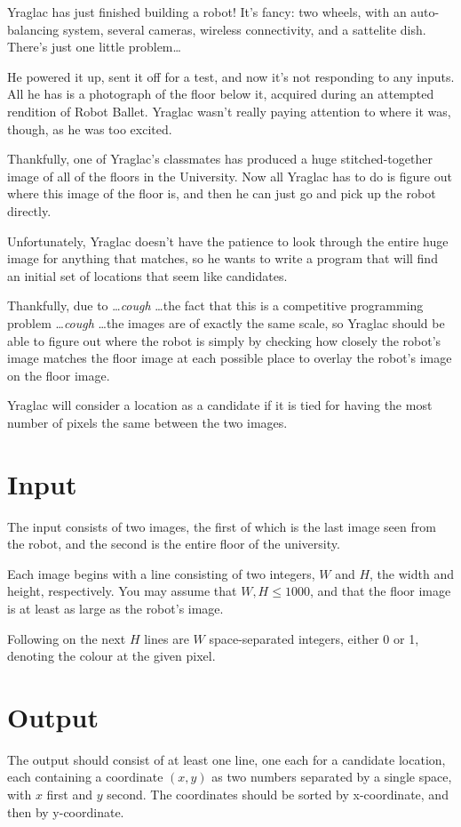 
Yraglac has just finished building a robot! It's fancy: two wheels, with an
auto-balancing system, several cameras, wireless connectivity, and a sattelite
dish. There's just one little problem\ldots

He powered it up, sent it off for a test, and now it's not responding to any
inputs. All he has is a photograph of the floor below it, acquired during an
attempted rendition of Robot Ballet. Yraglac wasn't really paying attention to
where it was, though, as he was too excited.

Thankfully, one of Yraglac's classmates has produced a huge stitched-together
image of all of the floors in the University. Now all Yraglac has to do is
figure out where this image of the floor is, and then he can just go and pick
up the robot directly.

Unfortunately, Yraglac doesn't have the patience to look through the entire
huge image for anything that matches, so he wants to write a program that will
find an initial set of locations that seem like candidates.

Thankfully, due to \ldots \emph{cough} \ldots the fact that this is a
competitive programming problem \ldots \emph{cough} \ldots the images are of
exactly the same scale, so Yraglac should be able to figure out where the robot
is simply by checking how closely the robot's image matches the floor image at
each possible place to overlay the robot's image on the floor image.

Yraglac will consider a location as a candidate if it is tied for having the
most number of pixels the same between the two images.

\section*{Input}

The input consists of two images, the first of which is the last image seen
from the robot, and the second is the entire floor of the university.

Each image begins with a line consisting of two integers, $W$ and $H$, the
width and height, respectively. You may assume that $W, H \leq 1000$, and that
the floor image is at least as large as the robot's image.

Following on the next $H$ lines are $W$ space-separated integers, either 0 or
1, denoting the colour at the given pixel.

\section*{Output}

The output should consist of at least one line, one each for a candidate
location, each containing a coordinate $(x,y)$ as two numbers separated by a
single space, with $x$ first and $y$ second. The coordinates should be sorted
by x-coordinate, and then by y-coordinate.
